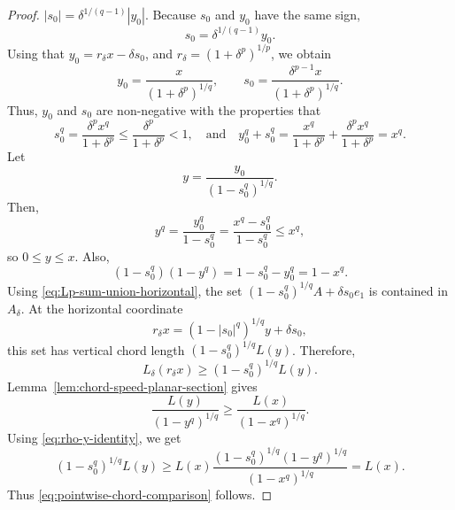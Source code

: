 \documentclass[11pt,a4paper]{amsart}
\theoremstyle{plain}
\theoremstyle{definition}
\begin{document}
\begin{proof}
$
\left|s_0\right|=\delta^{1 /(q-1)}\left|y_0\right| .
$
Because $s_0$ and $y_0$ have the same sign,
$$
s_0=\delta^{1 /(q-1)} y_0 .
$$
Using that $y_0  = r_\delta x- \delta s_0$, and $r_\delta=\left(1+\delta^p\right)^{1 / p}$, we obtain
\[
    y_0=\frac{x}{\left(1+\delta^p\right)^{1 / q}}, \qquad 
s_0
=\frac{\delta^{p-1} x}{(1+\delta^p)^{1/q}}.
\]
Thus, $y_0$ and $s_0$ are non-negative with the properties that
$$
s_0^q=\frac{\delta^p x^q}{1+\delta^p} \leq \frac{\delta^p}{1+\delta^p}<1 , \quad \text{and} \quad y_0^q+s_0^q=\frac{x^q}{1+\delta^p}+\frac{\delta^p x^q}{1+\delta^p}=x^q.
$$
Let $$ y = \frac{y_0}{(1-s_0^q)^{1/q}}.$$ Then,
\[
    y^q
    =\frac{y_0^q}{1-s_0^q}
    =\frac{x^q-s_0^q}{1-s_0^q}
    \leq x^q,
\]
so $0 \leq y\leq x$. Also,
\begin{equation}
\label{eq:rho-y-identity}
    (1-s_0^q)(1-y^q)
    =1-s_0^q-y_0^q
    =1-x^q.
\end{equation}
Using \eqref{eq:Lp-sum-union-horizontal}, the set $(1-s_0^q)^{1/q} A+\delta s_0 e_1$ is contained in $A_\delta$. At the horizontal coordinate
\[
    r_\delta x=(1-|s_0|^q)^{1/q} y+\delta s_0,
\]
this set has vertical chord length $(1-s_0^q)^{1/q} L(y)$. Therefore,
\[
    L_\delta(r_\delta x)\geq (1-s_0^q)^{1/q} L(y).
\]
Lemma~\ref{lem:chord-speed-planar-section} gives
\[
    \frac{L(y)}{(1-y^q)^{1/q}}
    \geq
    \frac{L(x)}{(1-x^q)^{1/q}}.
\]
Using \eqref{eq:rho-y-identity}, we get
\[
    (1-s_0^q)^{1/q} L(y)
    \geq
    L(x)\frac{(1-s_0^q)^{1/q}(1-y^q)^{1/q}}{(1-x^q)^{1/q}}
    =L(x).
\]
Thus \eqref{eq:pointwise-chord-comparison} follows.
\end{proof}
\end{document}
